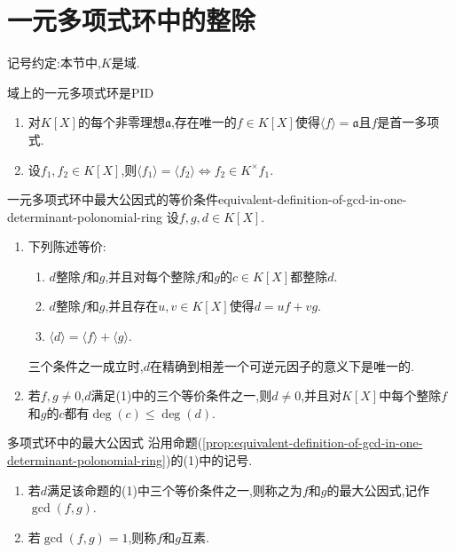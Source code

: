 \section{一元多项式环中的整除}

记号约定:本节中,$K$是域.

\begin{proposition}{域上的一元多项式环是PID}{}
	\begin{enumerate}
		\item 对$K\left[X\right]$的每个非零理想$\mathfrak{a}$,存在唯一的$f\in K\left[X\right]$使得$\langle f\rangle=\mathfrak{a}$且$f$是首一多项式.
		\item 设$f_{1},f_{2}\in K\left[X\right]$,则$\langle f_{1}\rangle=\langle f_{2}\rangle\iff f_{2}\in K^{\times}f_{1}$.
	\end{enumerate}
\end{proposition}

\begin{proposition}{一元多项式环中最大公因式的等价条件}{equivalent-definition-of-gcd-in-one-determinant-polonomial-ring}
	设$f,g,d\in K\left[X\right]$.
	\begin{enumerate}
		\item 下列陈述等价:
		\begin{enumerate}
			\item $d$整除$f$和$g$,并且对每个整除$f$和$g$的$c\in K\left[X\right]$都整除$d$.
			\item $d$整除$f$和$g$,并且存在$u,v\in K\left[X\right]$使得$d=uf+vg$.
			\item $\langle d\rangle=\langle f\rangle+\langle g\rangle$.
		\end{enumerate}
		三个条件之一成立时,$d$在精确到相差一个可逆元因子的意义下是唯一的.
		\item 若$f,g\neq 0$,$d$满足(1)中的三个等价条件之一,则$d\neq 0$,并且对$K\left[X\right]$中每个整除$f$和$g$的$c$都有$\deg\left(c\right)\leq\deg\left(d\right)$.
	\end{enumerate}
\end{proposition}

\begin{definition}{多项式环中的最大公因式}{}
	沿用命题(\ref{prop:equivalent-definition-of-gcd-in-one-determinant-polonomial-ring})的(1)中的记号.
	\begin{enumerate}
		\item 若$d$满足该命题的(1)中三个等价条件之一,则称之为$f$和$g$的最大公因式,记作$\gcd\left(f,g\right)$.
		\item 若$\gcd\left(f,g\right)=1$,则称$f$和$g$互素.
	\end{enumerate}
\end{definition}

